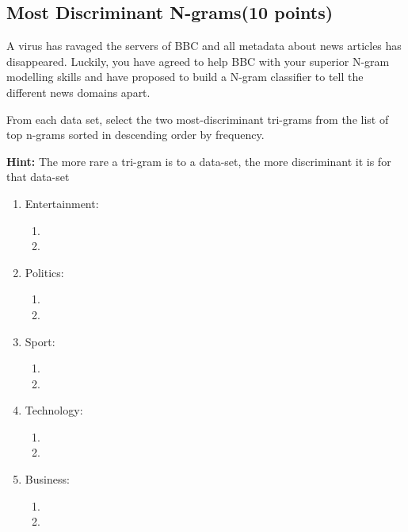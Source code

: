 \documentclass{exam}
\begin{document}
\newpage
\subsection{Most Discriminant N-grams(10 points)}
A virus has ravaged the servers of BBC and all metadata about news articles has disappeared. Luckily, you have agreed to help BBC with your superior N-gram modelling skills and have proposed to build a N-gram classifier to tell the different news domains apart.

From each data set, select the two most-discriminant tri-grams from the list of top n-grams sorted in descending order by frequency. 

\textbf{Hint:} The more rare a tri-gram is to a data-set, the more discriminant it is for that data-set
\begin{enumerate}
    \item Entertainment:
    \begin{enumerate}
        \item %
        \item %
    \end{enumerate}

    \item Politics:
    \begin{enumerate}
        \item %
        \item %
    \end{enumerate}

    \item Sport:
    \begin{enumerate}
        \item %
        \item %
    \end{enumerate}


    \item Technology:
    \begin{enumerate}
        \item %
        \item %
    \end{enumerate}

    \item Business:
    \begin{enumerate}
        \item %
        \item %
    \end{enumerate}
\end{enumerate}
\end{document}
